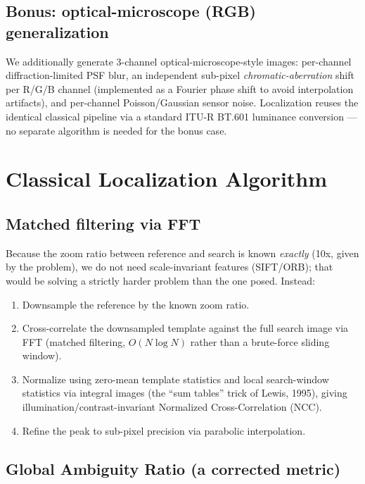 \documentclass[11pt]{article}
\begin{document}
\subsection{Bonus: optical-microscope (RGB) generalization}

We additionally generate 3-channel optical-microscope-style images:
per-channel diffraction-limited PSF blur, an independent sub-pixel
\emph{chromatic-aberration} shift per R/G/B channel (implemented as a
Fourier phase shift to avoid interpolation artifacts), and per-channel
Poisson/Gaussian sensor noise. Localization reuses the identical
classical pipeline via a standard ITU-R BT.601 luminance conversion ---
no separate algorithm is needed for the bonus case.

\section{Classical Localization Algorithm}

\subsection{Matched filtering via FFT}

Because the zoom ratio between reference and search is known
\emph{exactly} (10x, given by the problem), we do not need scale-invariant
features (SIFT/ORB); that would be solving a strictly harder problem than
the one posed. Instead:
\begin{enumerate}
  \item Downsample the reference by the known zoom ratio.
  \item Cross-correlate the downsampled template against the full search
    image via FFT (matched filtering, $O(N\log N)$ rather than a
    brute-force sliding window).
  \item Normalize using zero-mean template statistics and local
    search-window statistics via integral images (the ``sum tables''
    trick of Lewis, 1995), giving illumination/contrast-invariant
    Normalized Cross-Correlation (NCC).
  \item Refine the peak to sub-pixel precision via parabolic
    interpolation.
\end{enumerate}

\subsection{Global Ambiguity Ratio (a corrected metric)}
\label{sec:gar}
\end{document}
